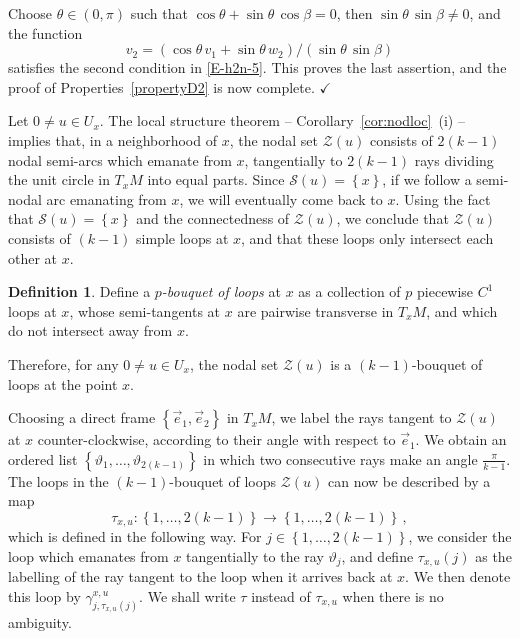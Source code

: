 \documentclass[12pt,a4paper]{amsart}
\theoremstyle{plain} %
\theoremstyle{definition}
\newtheorem{definition}[theorem]{Definition}
\numberwithin{equation}{section}
\numberwithin{figure}{section}
\numberwithin{table}{section}
\newcommand{\cS}{\mathcal{S}}
\newcommand{\cZ}{\mathcal{Z}}
\newcommand{\qedc}{$\checkmark$}
\newcommand{\set}[1]{\left\lbrace #1 \right\rbrace}
\begin{document}
Choose $\theta \in (0,\pi)$ such that $\cos\theta + \sin\theta \, \cos\beta = 0$, then $\sin\theta \, \sin\beta \not = 0$, and the function
%
\begin{equation*}
v_2 = \left( \cos\theta \, v_1 + \sin\theta \, w_2 \right)/ \left( \sin\theta \, \sin\beta \right)
\end{equation*}
%
satisfies the second condition in \eqref{E-h2n-5}. This proves the last assertion, and the proof of Properties~\ref{propertyD2} is now complete. \hfill \qedc \medskip

 Let $0 \neq u \in U_x$. The local structure theorem -- Corollary~\ref{cor:nodloc}~(i) -- implies that, in a neighborhood of $x$, the nodal set $\cZ(u)$ consists of  $2(k-1)$ nodal semi-arcs which emanate from $x$, tangentially to $2(k-1)$ rays dividing the unit circle in $T_xM$ into equal parts. Since $\cS(u) = \set{x}$, if we follow a semi-nodal arc emanating from $x$, we will eventually come back to $x$. Using the fact that $\cS(u) = \set{x}$ and the connectedness of $\cZ(u)$, we conclude that $\cZ(u)$ consists of $(k-1)$ simple loops at $x$, and that these loops only intersect each other at $x$.

\begin{definition}\label{D-h2n-rose}
 Define a \emph{$p$-bouquet of loops} at $x$ as a collection of $p$ piecewise $C^1$ loops at $x$, whose semi-tangents at $x$ are pairwise transverse in $T_xM$, and which do not intersect away from $x$.
\end{definition}%

Therefore, for any $0 \neq u \in U_x$, the nodal set $\cZ(u)$ is a $(k-1)$-bouquet of loops at the point $x$.\medskip

Choosing a direct frame $\set{\vec{e}_1, \vec{e}_2}$ in $T_xM$, we label the rays tangent to $\cZ(u)$ at $x$ counter-clockwise, according to their angle with respect to $\vec{e}_1$. We obtain an ordered list $\set{\vartheta_1, \ldots, \vartheta_{2(k-1)}}$ in which two consecutive rays make an angle $\frac{\pi}{k-1}$. The loops in the $(k-1)$-bouquet of loops $\cZ(u)$ can now be described by a map
%
\begin{equation}\label{E-h2n-tau}
\tau_{x,u} : \set{1,\ldots,2(k-1)} \to \set{1,\ldots,2(k-1)}\,,
\end{equation}
%
which is defined  in the following way. For $j \in   \set{1,\ldots,2(k-1)}$,  we consider the loop which emanates from $x$ tangentially to the ray $\vartheta_j$, and define  $\tau_{x,u}(j)$ as the labelling of the ray  tangent to the loop when it arrives back at $x$. We then denote this loop by $\gamma^{x,u}_{j,\tau_{x,u}(j)}$. We shall write $\tau$ instead of $\tau_{x,u}$ when there is no ambiguity.\smallskip
\end{document}
